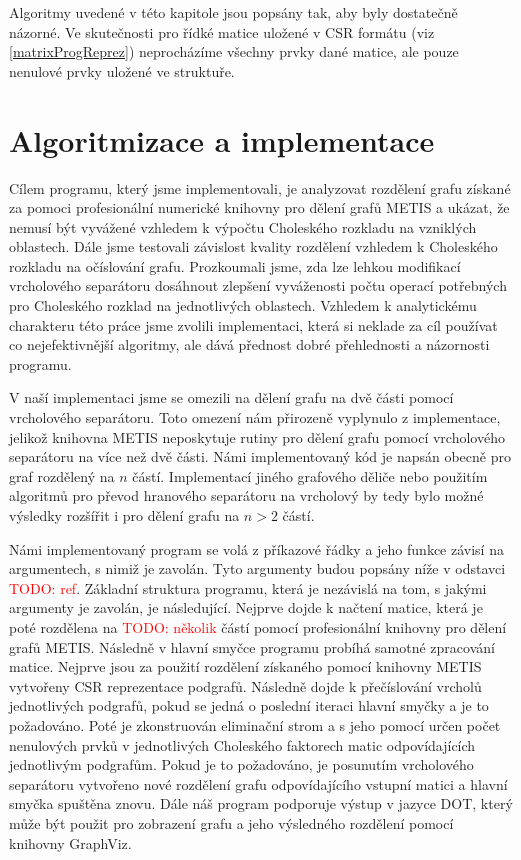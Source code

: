 \documentclass[11pt,american,czech,oneside]{book}
\theoremstyle{plain}
\theoremstyle{definition}
\newcommand{\TODO}[1]{\textcolor{red}{TODO: #1}}
\begin{document}
Algoritmy uvedené v této kapitole jsou popsány tak, aby byly dostatečně názorné. Ve skutečnosti pro řídké matice uložené v CSR formátu (viz \ref{matrixProgReprez}) neprocházíme všechny prvky dané matice, ale pouze nenulové prvky uložené ve struktuře.


\chapter{Algoritmizace a implementace}

Cílem programu, který jsme implementovali, je analyzovat rozdělení grafu získané za pomoci profesionální numerické knihovny pro dělení grafů METIS a ukázat, že nemusí být vyvážené vzhledem k výpočtu Choleského rozkladu na vzniklých oblastech. Dále jsme testovali závislost kvality rozdělení vzhledem k Choleského rozkladu na očíslování grafu. Prozkoumali jsme, zda lze lehkou modifikací vrcholového separátoru dosáhnout zlepšení vyváženosti počtu operací potřebných pro Choleského rozklad na jednotlivých oblastech. Vzhledem k analytickému charakteru této práce jsme zvolili implementaci, která si neklade za cíl používat co nejefektivnější algoritmy, ale dává přednost dobré přehlednosti a názornosti programu.

V naší implementaci jsme se omezili na dělení grafu na dvě části pomocí vrcholového separátoru. Toto omezení nám přirozeně vyplynulo z implementace, jelikož knihovna METIS neposkytuje rutiny pro dělení grafu pomocí vrcholového separátoru na více než dvě části. Námi implementovaný kód je napsán obecně pro graf rozdělený na $n$ částí. Implementací jiného grafového děliče nebo použitím algoritmů pro převod hranového separátoru na vrcholový by tedy bylo možné výsledky rozšířit i pro dělení grafu na $n>2$ částí.

Námi implementovaný program se volá z příkazové řádky a jeho funkce závisí na argumentech, s nimiž je zavolán. Tyto argumenty budou popsány níže v odstavci \TODO{ref}. Základní struktura programu, která je nezávislá na tom, s jakými argumenty je zavolán, je následující. Nejprve dojde k načtení matice, která je poté rozdělena na \TODO{několik} částí pomocí profesionální knihovny pro dělení grafů METIS. Následně v hlavní smyčce programu probíhá samotné zpracování matice. Nejprve jsou za použití rozdělení získaného pomocí knihovny METIS vytvořeny CSR reprezentace podgrafů. Následně dojde k přečíslování vrcholů jednotlivých podgrafů, pokud se jedná o poslední iteraci hlavní smyčky a je to požadováno. Poté je zkonstruován eliminační strom a s jeho pomocí určen počet nenulových prvků v jednotlivých Choleského faktorech matic odpovídajících jednotlivým podgrafům. Pokud je to požadováno, je posunutím vrcholového separátoru vytvořeno nové rozdělení grafu odpovídajícího vstupní matici a hlavní smyčka spuštěna znovu. Dále náš program podporuje výstup v jazyce DOT, který může být použit pro zobrazení grafu a jeho výsledného rozdělení pomocí knihovny GraphViz.
\end{document}
